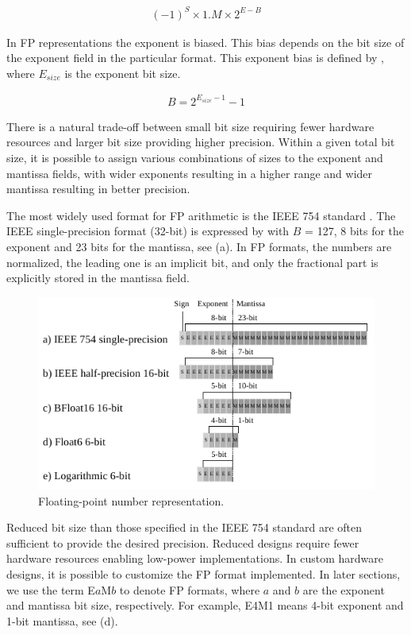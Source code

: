 \begin{eqnarray} \label{eq:float}
(-1)^{S} \times 1.M \times 2^{E-B}
\end{eqnarray}

In FP representations the exponent is biased. This bias depends on the bit size of the exponent field in the particular format. This exponent bias is defined by , where $E_{size}$ is the exponent bit size.

\begin{eqnarray} \label{eq:float_bias}
B=2^{E_{size}-1}-1
\end{eqnarray}

There is a natural trade-off between small bit size requiring fewer hardware resources and larger bit size providing higher precision. Within a given total bit size, it is possible to assign various combinations of sizes to the exponent and mantissa fields, with wider exponents resulting in a higher range and wider mantissa resulting in better precision.

The most widely used format for FP arithmetic is the IEEE 754 standard \cite{zuras2008ieee}. The IEEE single-precision format (32-bit) is expressed by  with $B$ = 127, 8 bits for the exponent and 23 bits for the mantissa, see (a). In FP formats, the numbers are normalized, the leading one is an implicit bit, and only the fractional part is explicitly stored in the mantissa field.

\begin{figure}[h!]
	\centering
	\includegraphics[width=1\columnwidth]{../figures/power_breakdown/floating_point.pdf}
	\caption{Floating-point number representation.}
	\label{fig:floating}
\end{figure}

Reduced bit size than those specified in the IEEE 754 standard are often sufficient to provide the desired precision. Reduced designs require fewer hardware resources enabling low-power implementations. In custom hardware designs, it is possible to customize the FP format implemented. In later sections, we use the term E$a$M$b$ to denote FP formats, where $a$ and $b$ are the exponent and mantissa bit size, respectively. For example, E4M1 means 4-bit exponent and 1-bit mantissa, see (d).

